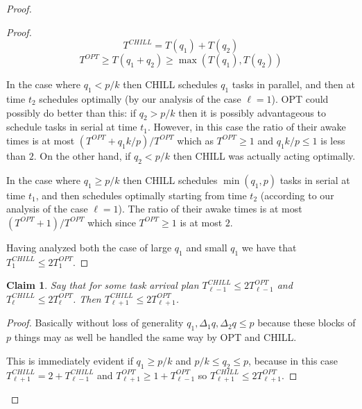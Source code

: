 \documentclass[twocolumn]{article}[11pt]
\newtheorem{clm}{Claim}
\begin{document}
\begin{proof}
\begin{proof}
  $$T^{CHILL} = T(q_1) + T(q_2)$$
  $$T^{OPT} \ge T(q_1 + q_2)\ge \max(T(q_1), T(q_2))$$


  In the case where $q_1 < p/k$ then CHILL schedules $q_1$ tasks in
  parallel, and then at time $t_2$ schedules optimally (by our
  analysis of the case $\ell=1$). OPT could possibly do better
  than this: if $q_2 > p/k$ then it is possibly
  advantageous to schedule tasks in serial at time $t_1$.
  However, in this case the ratio of their awake times is at
  most $(T^{OPT} + q_1 k/p)/T^{OPT}$ which as $T^{OPT} \ge 1$ and
  $q_1 k/p \le 1$ is less than $2$. On the other hand, if $q_2 < p/k$
  then CHILL was actually acting optimally. 

  In the case where $q_1 \ge p/k$ then CHILL schedules $\min(q_1,
  p)$ tasks in serial at time $t_1$, and then schedules optimally
  starting from time $t_2$ (according to our analysis of the case
  $\ell=1$). The ratio of their awake times is at most
  $(T^{OPT}+1)/T^{OPT}$ which since $T^{OPT} \ge 1$ is at most
  $2$.

  Having analyzed both the case of large $q_1$ and small $q_1$ we have
  that $T_1^{CHILL} \le 2T_1^{OPT}$. 
  \end{proof}


  \begin{clm}
    \label{clm:inductivestep}
    Say that for some task arrival plan 
  $T_{\ell-1}^{CHILL} \le 2T_{\ell-1}^{OPT}$ and
  $T_\ell^{CHILL} \le 2T_\ell^{OPT}$. Then 
  $T_{\ell+1}^{CHILL} \le 2T_{\ell+1}^{OPT}$.
  \end{clm}
  \begin{proof}
    Basically without loss of generality $q_1, \Delta_1 q,
    \Delta_2 q \le p$ because these blocks of $p$ things may as
    well be handled the same way by OPT and CHILL. 

    This is immediately evident if $q_1 \ge p/k$ and $p/k \le q_2 \le p$,
    because in this case $T_{\ell+1}^{CHILL} = 2 + T_{\ell -1}^{CHILL}$
    and $T_{\ell+1}^{OPT} \ge 1 + T_{\ell-1}^{OPT}$ so
    $T_{\ell+1}^{CHILL} \le 2T_{\ell+1}^{OPT}$. 


\end{proof}
\end{proof}
\end{document}

